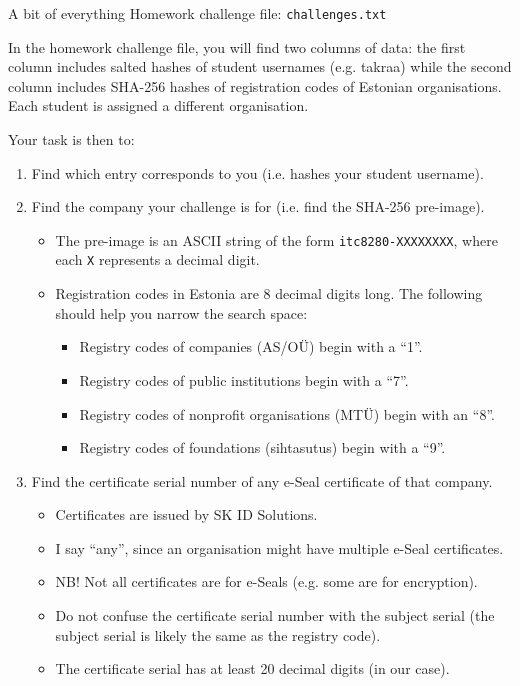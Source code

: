 \documentclass{homework}
\begin{document}
\begin{task}{A bit of everything}
  Homework challenge file: \texttt{challenges.txt}

  In the homework challenge file, you will find two columns of data: the first column includes salted hashes of student usernames (e.g. takraa) while the second column includes SHA-256 hashes of registration codes of Estonian organisations.
  Each student is assigned a different organisation.

  Your task is then to:
  \begin{enumerate}
    \item Find which entry corresponds to you (i.e. hashes your student username).
    \item Find the company your challenge is for (i.e. find the SHA-256 pre-image).
    \begin{itemize}
      \item The pre-image is an ASCII string of the form \texttt{itc8280-XXXXXXXX}, where each \texttt{X} represents a decimal digit.
      \item Registration codes in Estonia are 8 decimal digits long.
            The following should help you narrow the search space:
            \begin{itemize}
              \item Registry codes of companies (AS/OÜ) begin with a \enquote{1}.
              \item Registry codes of public institutions begin with a \enquote{7}.
              \item Registry codes of nonprofit organisations (MTÜ) begin with an \enquote{8}.
              \item Registry codes of foundations (sihtasutus) begin with a \enquote{9}.
            \end{itemize}
    \end{itemize}
    \item Find the certificate serial number of any e-Seal certificate of that company.
    \begin{itemize}
      \item Certificates are issued by SK ID Solutions.
      \item I say \enquote{any}, since an organisation might have multiple e-Seal certificates.
      \item NB! Not all certificates are for e-Seals (e.g. some are for encryption).
      \item Do not confuse the certificate serial number with the subject serial (the subject serial is likely the same as the registry code).
      \item The certificate serial has at least 20 decimal digits (in our case).
    \end{itemize}
  \end{enumerate}


\end{task}
\end{document}
